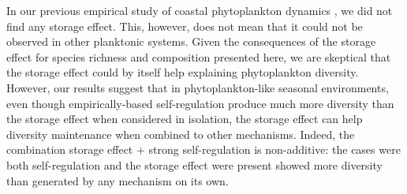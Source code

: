 \documentclass[a4paper,12pt]{article}
\begin{document}
In our previous empirical study of coastal phytoplankton dynamics
\citep{barraquand2018coastal}, we did not find any storage effect.
This, however, does not mean that it could not be observed in other
planktonic systems. Given the consequences of the storage effect for
species richness and composition presented here, we are skeptical
that the storage effect could by itself help explaining phytoplankton
diversity. However, our results suggest that in phytoplankton-like
seasonal environments, even though empirically-based self-regulation
produce much more diversity than the storage effect when considered
in isolation, the storage effect can help diversity maintenance when
combined to other mechanisms. Indeed, the combination storage effect
+ strong self-regulation is non-additive: the cases were both self-regulation
and the storage effect were present showed more diversity than generated
by any mechanism on its own. 
\end{document}
